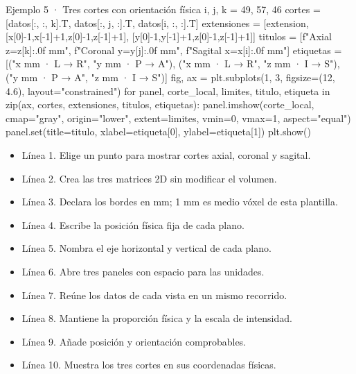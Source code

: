 \begin{Codigo}{Ejemplo 5 · Tres cortes con orientación física}
i, j, k = 49, 57, 46
cortes = [datos[:, :, k].T, datos[:, j, :].T, datos[i, :, :].T]
extensiones = [extension, [x[0]-1,x[-1]+1,z[0]-1,z[-1]+1], [y[0]-1,y[-1]+1,z[0]-1,z[-1]+1]]
titulos = [f"Axial z={z[k]:.0f} mm", f"Coronal y={y[j]:.0f} mm", f"Sagital x={x[i]:.0f} mm"]
etiquetas = [("x mm · L → R", "y mm · P → A"), ("x mm · L → R", "z mm · I → S"), ("y mm · P → A", "z mm · I → S")]
fig, ax = plt.subplots(1, 3, figsize=(12, 4.6), layout="constrained")
for panel, corte_local, limites, titulo, etiqueta in zip(ax, cortes, extensiones, titulos, etiquetas):
    panel.imshow(corte_local, cmap="gray", origin="lower", extent=limites, vmin=0, vmax=1, aspect="equal")
    panel.set(title=titulo, xlabel=etiqueta[0], ylabel=etiqueta[1])
plt.show()
\end{Codigo}


\begin{itemize}

\item Línea 1. Elige un punto para mostrar cortes axial, coronal y sagital.

\item Línea 2. Crea las tres matrices 2D sin modificar el volumen.

\item Línea 3. Declara los bordes en mm; 1 mm es medio vóxel de esta plantilla.

\item Línea 4. Escribe la posición física fija de cada plano.

\item Línea 5. Nombra el eje horizontal y vertical de cada plano.

\item Línea 6. Abre tres paneles con espacio para las unidades.

\item Línea 7. Reúne los datos de cada vista en un mismo recorrido.

\item Línea 8. Mantiene la proporción física y la escala de intensidad.

\item Línea 9. Añade posición y orientación comprobables.

\item Línea 10. Muestra los tres cortes en sus coordenadas físicas.

\end{itemize}

